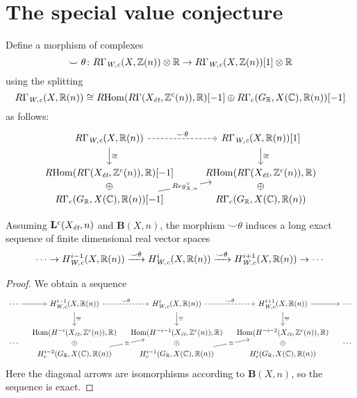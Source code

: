 \documentclass{article}
\numberwithin{equation}{section}
\begin{document}

\section{The special value conjecture}
\label{sec:special-value-conjecture}

\begin{definition}
  Define a morphism of complexes
  \[ \smile\theta\colon R\Gamma_\Wc (X,\ZZ(n)) \otimes \RR \to
    R\Gamma_\Wc (X,\ZZ(n)) [1] \otimes \RR \]
  using the splitting
  \[ R\Gamma_\Wc (X, \RR (n)) \cong
    \RHom (R\Gamma (X_\et, \ZZ^c (n)), \RR) [-1] \oplus
    R\Gamma_c (G_\RR, X (\CC), \RR (n)) [-1] \]
  as follows:
  \[ \begin{tikzcd}
      R\Gamma_\Wc (X, \RR(n)) \ar{d}{\cong}\ar[dashed]{r}{\smile\theta} & R\Gamma_\Wc (X, \RR(n)) [1]\ar{d}{\cong} \\
      \RHom (R\Gamma (X_\et, \ZZ^c (n)), \RR) [-1] & \RHom (R\Gamma (X_\et, \ZZ^c (n)), \RR) \\[-2em]
      \oplus & \oplus \\[-2em]
      R\Gamma_c (G_\RR, X (\CC), \RR (n)) [-1]\ar{uur}[description]{Reg_{X,n}^\vee} & R\Gamma_c (G_\RR, X (\CC), \RR (n))
    \end{tikzcd} \]
\end{definition}

\begin{lemma}
  \label{lemma:smile-theta}
  Assuming $\mathbf{L}^c (X_\et,n)$ and $\mathbf{B} (X,n)$, the morphism
  $\smile\theta$ induces a long exact sequence of finite dimensional real vector
  spaces
  \[ \cdots \to H^{i-1}_\Wc (X, \RR (n))
    \xrightarrow{\smile\theta}
    H^i_\Wc (X, \RR (n))
    \xrightarrow{\smile\theta}
    H^{i+1}_\Wc (X, \RR (n)) \to \cdots \]

  \begin{proof}
    We obtain a sequence
    \[ \begin{tikzcd}[column sep=1em]
        \cdots\ar{r} & H^{i-1}_\Wc (X, \RR(n)) \ar{d}{\cong}\ar[dashed]{r}{\smile\theta} & H^i_\Wc (X, \RR(n))\ar{d}{\cong}\ar[dashed]{r}{\smile\theta} & H^{i+1}_\Wc (X, \RR(n))\ar{d}{\cong} \ar{r} & \cdots \\
        & \Hom (H^{-i} (X_\et, \ZZ^c (n)), \RR) & \Hom (H^{-i-1} (X_\et, \ZZ^c (n)), \RR) & \Hom (H^{-i-2} (X_\et, \ZZ^c (n)), \RR) \\[-2em]
        \cdots & \oplus & \oplus & \oplus & \cdots \\[-2em]
        & H_c^{i-2} (G_\RR, X (\CC), \RR (n))\ar{uur}[description]{\cong} & H_c^{i-1} (G_\RR, X (\CC), \RR (n))\ar{uur}[description]{\cong} & H_c^i (G_\RR, X (\CC), \RR (n))
      \end{tikzcd} \]
    Here the diagonal arrows are isomorphisms according to $\mathbf{B} (X,n)$,
    so the sequence is exact.
  \end{proof}
\end{lemma}
\end{document}
